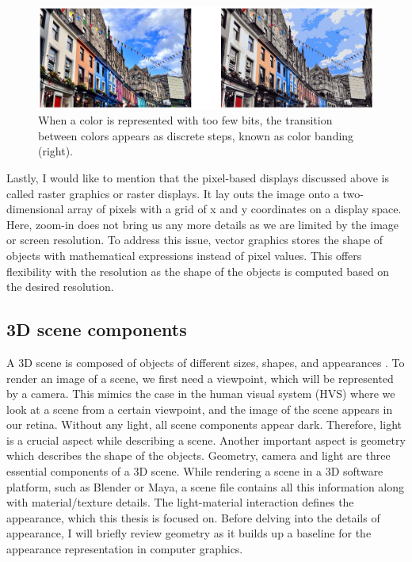 \begin{figure}
  \centering
    \includegraphics[width=0.9\linewidth]{Images/color_quantization.png}

    \caption{When a color is represented with too few bits, the transition between colors appears as discrete steps, known as color banding (right).}\label{fig:color-band}
\end{figure} 



Lastly, I would like to mention that the pixel-based displays discussed above is called raster graphics or raster displays. It lay outs the image onto a two-dimensional array of pixels with a grid of x and y coordinates on a display space. Here, zoom-in does not bring us any more details as we are limited by the image or screen resolution. To address this issue, vector graphics stores the shape of objects with mathematical expressions instead of pixel values. This offers flexibility with the resolution as the shape of the objects is computed based on the desired resolution.

\subsection{3D scene components}

A 3D scene is composed of objects of different sizes, shapes, and appearances . To render an image of a scene, we first need a viewpoint, which will be represented by a camera. This mimics the case in the human visual system (HVS) where we look at a scene from a certain viewpoint, and the image of the scene appears in our retina. Without any light, all scene components appear dark. Therefore, light is a crucial aspect while describing a scene. Another important aspect is geometry which describes the shape of the objects. Geometry, camera and light are three essential components of a 3D scene. While rendering a scene in a 3D software platform, such as Blender or Maya, a scene file contains all this information along with material/texture details. The light-material interaction defines the appearance, which this thesis is focused on. Before delving into the details of appearance, I will briefly review geometry as it builds up a baseline for the appearance representation in computer graphics.

